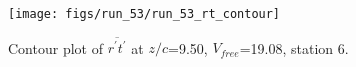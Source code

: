 \begin{figure}[H]
\centering
\texttt{[image: figs/run\_53/run\_53\_rt\_contour]}
\caption{Contour plot of $\overline{r^\prime t^\prime}$ at $z/c$=9.50, $V_{free}$=19.08, station 6.}
\label{fig:run_53_rt_contour}
\end{figure}


